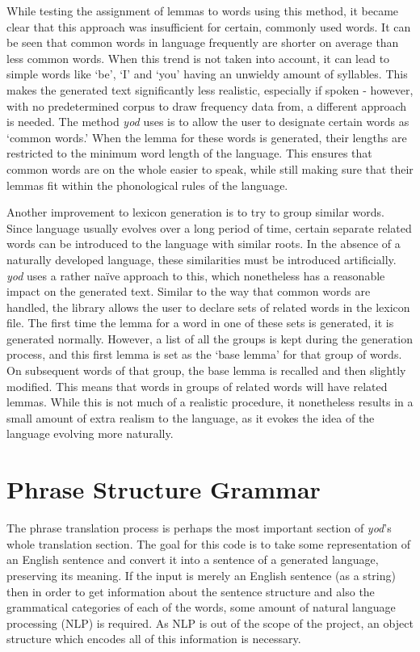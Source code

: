 \documentclass{report}
\begin{document}
	While testing the assignment of lemmas to words using this method, it became clear that this approach was insufficient for certain, commonly used words. It can be seen that common words in language frequently are shorter on average than less common words\cite{miller1958370}\cite{strauss2007word}. When this trend is not taken into account, it can lead to simple words like `be', `I' and `you' having an unwieldy amount of syllables. This makes the generated text significantly less realistic, especially if spoken - however, with no predetermined corpus to draw frequency data from, a different approach is needed. The method \textit{yod} uses is to allow the user to designate certain words as `common words.' When the lemma for these words is generated, their lengths are restricted to the minimum word length of the language. This ensures that common words are on the whole easier to speak, while still making sure that their lemmas fit within the phonological rules of the language.
	
	Another improvement to lexicon generation is to try to group similar words. Since language usually evolves over a long period of time, certain separate related words can be introduced to the language with similar roots. In the absence of a naturally developed language, these similarities must be introduced artificially. \textit{yod} uses a rather na\"ive approach to this, which nonetheless has a reasonable impact on the generated text. Similar to the way that common words are handled, the library allows the user to declare sets of related words in the lexicon file. The first time the lemma for a word in one of these sets is generated, it is generated normally. However, a list of all the groups is kept during the generation process, and this first lemma is set as the `base lemma' for that group of words. On subsequent words of that group, the base lemma is recalled and then slightly modified. This means that words in groups of related words will have related lemmas. While this is not much of a realistic procedure, it nonetheless results in a small amount of extra realism to the language, as it evokes the idea of the language evolving more naturally.
	
	\section{Phrase Structure Grammar}
	
	The phrase translation process is perhaps the most important section of \textit{yod}'s whole translation section. The goal for this code is to take some representation of an English sentence and convert it into a sentence of a generated language, preserving its meaning. If the input is merely an English sentence (as a string) then in order to get information about the sentence structure and also the grammatical categories of each of the words, some amount of natural language processing (NLP) is required. As NLP is out of the scope of the project, an object structure which encodes all of this information is necessary.
	
\end{document}
